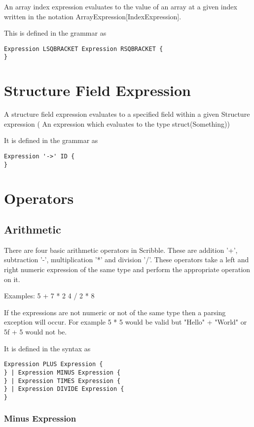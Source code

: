 \documentclass[]{final_report}
\begin{document}
An array index expression evaluates to the value of an array at a given index written in the notation ArrayExpression[IndexExpression].

This is defined in the grammar as \begin{verbatim}
Expression LSQBRACKET Expression RSQBRACKET {
}
\end{verbatim}

\section{Structure Field Expression}

A structure field expression evaluates to a specified field within a given Structure expression ( An expression which evaluates to the type struct(Something))

It is defined in the grammar as
\begin{verbatim}
Expression '->' ID {
}
\end{verbatim}

\section{Operators}

\subsection{Arithmetic}

There are four basic arithmetic operators in Scribble. These are addition '+', subtraction '-', multiplication '*' and division '/'. These operators take a left and right numeric expression of the same type and perform the appropriate operation on it.

Examples: 
5 + 7 * 2
4 / 2 * 8

If the expressions are not numeric or not of the same type then a parsing exception will occur. For example 5 * 5 would be valid but "Hello" + "World" or 5f + 5 would not be.

It is defined in the syntax as
\begin{verbatim}
Expression PLUS Expression {
} | Expression MINUS Expression {
} | Expression TIMES Expression {
} | Expression DIVIDE Expression {
}
\end{verbatim}

\subsubsection{Minus Expression}
\end{document}
